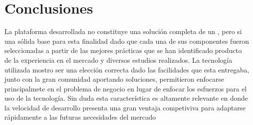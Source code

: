 

\chapter{Conclusiones} \label{cap:conclusiones}
	
	La plataforma desarrollada no constituye una solución completa de un \frameworkPC \ecommerceCOM, pero si una sólida base para esta finalidad dado que cada una de sus componentes fueron seleccionadas a partir de las mejores prácticas que se han identificado producto de la experiencia en el mercado y diversos estudios realizados.
	La tecnología utilizada mostro ser una elección correcta dado las facilidades que esta entregaba, junto con la gran comunidad aportando soluciones, permitieron enfocarse principalmete en el problema de negocio en lugar de enfocar los esfuerzos para el uso de la tecnología. Sin duda esta característica es altamente relevante en donde la velocidad de desarrollo presenta una gran ventaja competiviva para adaptarse rápidamente a las futuras necesidades del mercado













